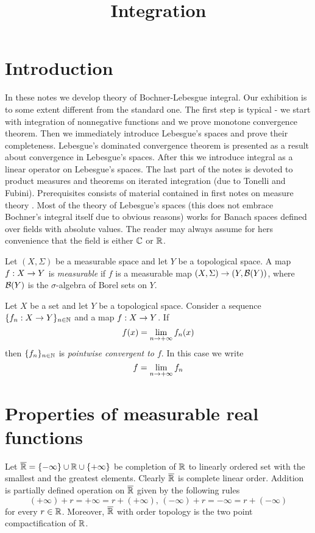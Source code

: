 



\title{Integration}
\date{}
\maketitle

\section{Introduction}
In these notes we develop theory of Bochner-Lebesgue integral. Our exhibition is to some extent different from the standard one. The first step is typical - we start with integration of nonnegative functions and we prove monotone convergence theorem. Then we immediately introduce Lebesgue's spaces and prove their completeness. Lebesgue's dominated convergence theorem is presented as a result about convergence in Lebesgue's spaces. After this we introduce integral as a linear operator on Lebesgue's spaces. The last part of the notes is devoted to product measures and theorems on iterated integration (due to Tonelli and Fubini). Prerequisites consists of material contained in first notes on measure theory \cite{Introduction_to_measure_theory}. Most of the theory of Lebesgue's spaces (this does not embrace Bochner's integral itself due to obvious reasons) works for Banach spaces defined over fields with absolute values. The reader may always assume for hers convenience that the field is either ${\mathbb C}$ or ${\mathbb R}$.

\begin{definition}
Let $(X,\Sigma)$ be a measurable space and let $Y$ be a topological space. A map $f:X\rightarrow Y$ is \textit{measurable} if $f$ is a measurable map $(X,\Sigma)\rightarrow (Y,{\mathcal B}(Y))$, where ${\mathcal B}(Y)$ is the $\sigma$-algebra of Borel sets on $Y$. 
\end{definition}

\begin{definition}
Let $X$ be a set and let $Y$ be a topological space. Consider a sequence $\{f_n:X\rightarrow Y\}_{n\in {\mathbb N}}$ and a map $f:X\rightarrow Y$. If 
$$f(x) = \lim_{n\rightarrow +\infty}f_n(x)$$
then $\{f_n\}_{n\in {\mathbb N}}$ is \textit{pointwise convergent to $f$}. In this case we write
$$f = \lim_{n\rightarrow +\infty}f_n$$
\end{definition}

\section{Properties of measurable real functions}
\noindent
Let $\overline{{\mathbb R}}=\{-\infty\} \cup {\mathbb R} \cup \{+\infty\}$ be completion of ${\mathbb R}$ to linearly ordered set with the smallest and the greatest elements. Clearly $\overline{{\mathbb R}}$ is complete linear order. Addition is partially defined operation on $\overline{{\mathbb R}}$ given by the following rules
$$(+\infty)+r=+\infty=r+(+\infty),\,(-\infty)+r=-\infty=r+(-\infty)$$
for every $r\in {\mathbb R}$. Moreover, $\overline{{\mathbb R}}$ with order topology is the two point compactification of ${\mathbb R}$.

